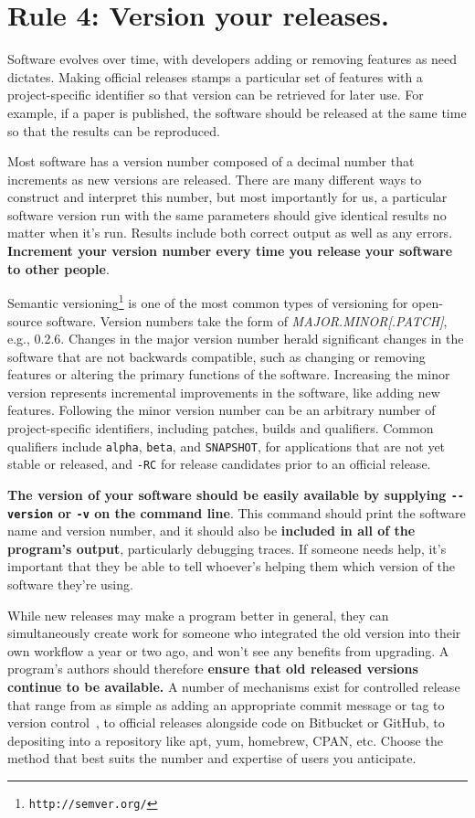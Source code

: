 \documentclass[10pt,letterpaper]{article}
\newcommand{\withurl}[2]{{#1}\footnote{\texttt{#2}}}
\newcommand{\rulemajor}[1]{\section{#1}}
\newcommand{\ruleminor}[1]{\textbf{#1}}
\begin{document}
\rulemajor{Rule 4: Version your releases.}

Software evolves over time, with developers adding or removing features as need
dictates. Making official releases stamps a particular set of features with a
project-specific identifier so that version can be retrieved for later use. For
example, if a paper is published, the software should be released at the same
time so that the results can be reproduced. 

Most software has a version number composed of a decimal number that
increments as new versions are released. 
There are many different ways
to construct and interpret this number, but most importantly for us, a
particular software version run with the same parameters should give
identical results no matter when it's run. Results include both correct
output as well as any errors.
\ruleminor{Increment your version number every time you release your software to
other people}.

\withurl{Semantic versioning}{http://semver.org/} is one of the most common
types of versioning for open-source software. Version numbers take the
form of \emph{MAJOR.MINOR{[}.PATCH{]}}, e.g., 0.2.6.
Changes in the major
version number herald significant changes in the software that are not
backwards compatible, such as changing or removing features or altering
the primary functions of the software. Increasing the minor version
represents incremental improvements in the software, like adding new
features. Following the minor version number can be an arbitrary number
of project-specific identifiers, including patches, builds and qualifiers.
Common qualifiers include \texttt{alpha}, \texttt{beta}, and \texttt{SNAPSHOT},
for applications that are
not yet stable or released, and \texttt{-RC} for release candidates prior
to an official release.

\ruleminor{The version of your software should be easily available by 
supplying \texttt{-\/-version} or \texttt{-v} on the command line}. This command should print
the software name and version number, and it should
also be \ruleminor{included in all of the program's output}, particularly debugging
traces.  If someone needs help, it's important that they be able to tell
whoever's helping them which version of the software they're using.

While new releases may make a program better in general,
they can simultaneously create work for someone
who integrated the old version into their own workflow a year or two ago,
and won't see any benefits from upgrading.
A program's authors should therefore \ruleminor{ensure that old released versions
continue to be available.}
A number of mechanisms exist for
controlled release that range from as simple as adding an appropriate
commit message or tag to version control~\cite{blischak2016}, to official releases alongside
code on Bitbucket or GitHub, to depositing into a
repository like apt, yum, homebrew, CPAN, etc. Choose the method that
best suits the number and expertise of users you anticipate.
\end{document}
